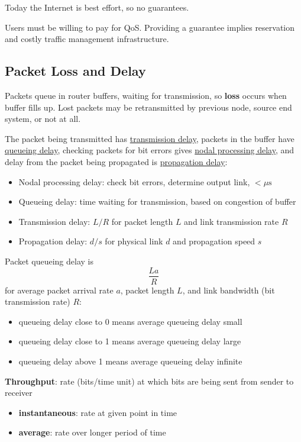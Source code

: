 \documentclass[11pt]{article}
\begin{document}
Today the Internet is best effort, so no guarantees.

Users must be willing to pay for QoS.
Providing a guarantee implies reservation and costly traffic management infrastructure.
\subsection{Packet Loss and Delay}
\label{sec:orgec7d5bb}
Packets queue in router buffers, waiting for transmission, so \textbf{loss} occurs when buffer fills up.
Lost packets may be retransmitted by previous node, source end system, or not at all.

The packet being transmitted has \uline{transmission delay}, packets in the buffer have
\uline{queueing delay}, checking packets for bit errors gives \uline{nodal processing delay},
and delay from the packet being propagated is \uline{propagation delay}:
\begin{itemize}
\item Nodal processing delay: check bit errors, determine output link, \(< \mu \text{s}\)
\item Queueing delay: time waiting for transmission, based on congestion of buffer
\item Transmission delay: \(L/R\) for packet length \(L\) and link transmission rate \(R\)
\item Propagation delay: \(d/s\) for physical link \(d\) and propagation speed \(s\)
\end{itemize}

Packet queueing delay is
$$ \frac{La}{R} $$
for average packet arrival rate \(a\), packet length \(L\), and link bandwidth (bit transmission rate) \(R\):
\begin{itemize}
\item queueing delay close to 0 means average queueing delay small
\item queueing delay close to 1 means average queueing delay large
\item queueing delay above 1 means average queueing delay infinite
\end{itemize}

\textbf{Throughput}: rate (bits/time unit) at which bits are being sent from sender to receiver
\begin{itemize}
\item \textbf{instantaneous}: rate at given point in time
\item \textbf{average}: rate over longer period of time
\end{itemize}
\end{document}
